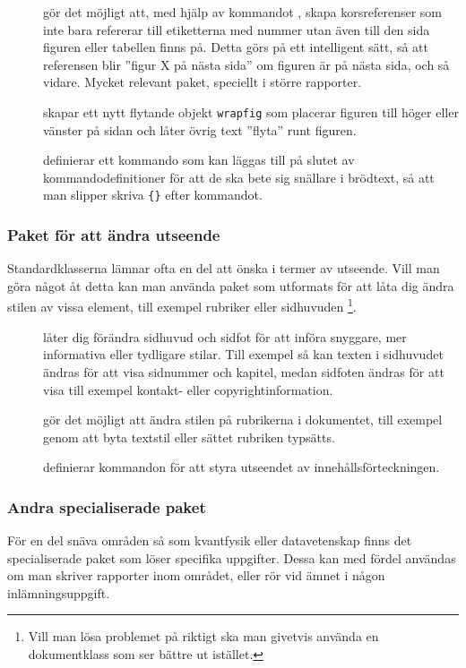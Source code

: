 \documentclass[lang=sv,ptsize=10pt,font=none,nomath,titles=bf,../../a4.tex]{subfiles}
\begin{document}
\begin{description}
	\item[]
	gör det möjligt att, med hjälp av kommandot ,
	skapa korsreferenser
	som inte bara refererar till etiketterna med nummer utan även till den
	sida figuren eller tabellen finns på. Detta görs på ett intelligent
	sätt, så att referensen blir ”figur X på nästa sida” om figuren är på
	nästa sida, och så vidare. Mycket relevant paket, speciellt i större
	rapporter.
	
	\item[]
	skapar ett nytt flytande objekt \texttt{wrapfig} som placerar figuren
	till höger eller vänster på sidan och låter övrig text ”flyta” runt
	figuren.
	
	\item[]
	definierar ett kommando  som kan läggas till på slutet av
	kommandodefinitioner för att de ska bete sig snällare i brödtext, så
	att man slipper skriva \texttt{\{\}} efter kommandot.
\end{description}

\subsubsection{Paket för att ändra utseende}
Standardklasserna lämnar ofta en del att önska i termer av utseende. Vill
man göra något åt detta kan man använda paket som utformats för att låta
dig ändra stilen av vissa element, till exempel rubriker eller sidhuvuden%
\footnote{Vill man lösa problemet på riktigt ska man givetvis använda en
dokumentklass som ser bättre ut istället.}.

\begin{description}
	\item[]
	låter dig förändra sidhuvud och sidfot för att införa snyggare, mer
	informativa eller tydligare stilar. Till exempel så kan texten i
	sidhuvudet ändras för att visa sidnummer och kapitel, medan sidfoten
	ändras för att visa till exempel kontakt- eller copyrightinformation.
	
	\item[]
	gör det möjligt att ändra stilen på rubrikerna i dokumentet, till
	exempel genom att byta textstil eller sättet rubriken typsätts.

	\item[]
	definierar kommandon för att styra utseendet av
	innehållsförteckningen.
\end{description}

\subsubsection{Andra specialiserade paket}
För en del snäva områden så som kvantfysik eller datavetenskap finns det
specialiserade paket som löser specifika uppgifter. Dessa kan med fördel
användas om man skriver rapporter inom området, eller rör vid ämnet i
någon inlämningsuppgift.
\end{document}
